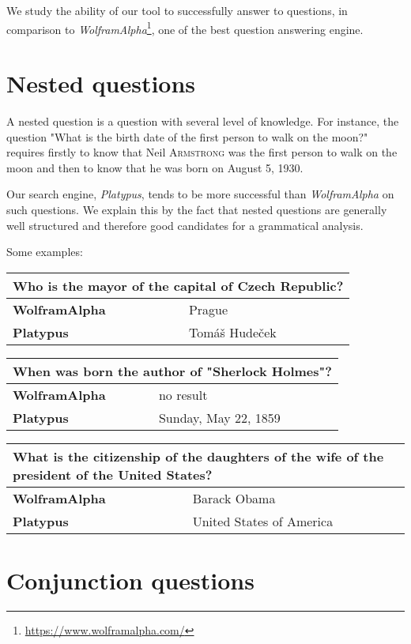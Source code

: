 We study the ability of our tool to successfully answer to questions, in comparison
to \emph{WolframAlpha}\footnote{\url{https://www.wolframalpha.com/}}, one of the best
question answering engine.

\section{Nested questions}

A nested question is a question with several level of knowledge. For instance, the
question "What is the birth date of the first person to walk on the moon?" requires
firstly to know that Neil \textsc{Armstrong} was the first person to walk on the
moon and then to know that he was born on August 5, 1930.

Our search engine, \emph{Platypus}, tends to be more successful than \emph{WolframAlpha}
on such questions. We explain this by the fact that nested questions are generally
well structured and therefore good candidates for a grammatical analysis.

Some examples:

\begin{tabular}{l|l}
    \multicolumn{2}{l}{Who is the mayor of the capital of Czech Republic?} \\
    \hline
    \textbf{WolframAlpha} & Prague\\
    \textbf{Platypus} & Tomáš Hudeček\\
\end{tabular}

\begin{tabular}{l|l}
    \multicolumn{2}{l}{When was born the author of "Sherlock Holmes"?} \\
    \hline
    \textbf{WolframAlpha} & no result\\
    \textbf{Platypus} & Sunday, May 22, 1859\\
\end{tabular}

\begin{tabular}{l|l}
    \multicolumn{2}{l}{What is the citizenship of the daughters of the wife of the president of the United States?} \\
    \hline
    \textbf{WolframAlpha} & Barack Obama\\
    \textbf{Platypus} & United States of America\\
\end{tabular}

\section{Conjunction questions}

